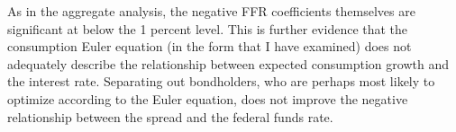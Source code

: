 As in the aggregate analysis, the negative FFR coefficients themselves are significant at below the 1 percent level. This is further evidence that the consumption Euler equation (in the form that I have examined) does not adequately describe the relationship between expected consumption growth and the interest rate. Separating out bondholders, who are perhaps most likely to optimize according to the Euler equation, does not improve the negative relationship between the spread and the federal funds rate.
